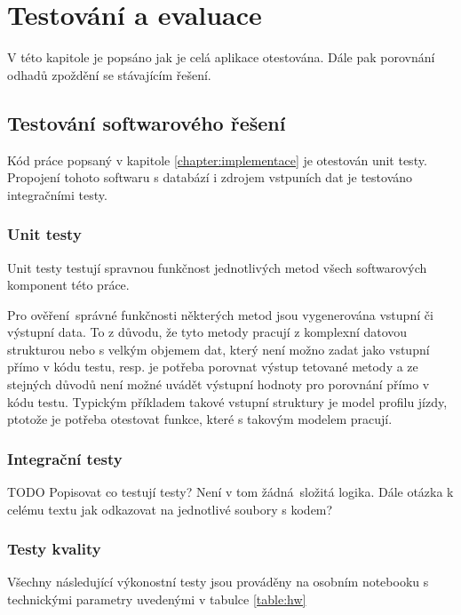 
\chapter{Testování a evaluace}

V této kapitole je popsáno jak je celá aplikace otestována. Dále pak porovnání odhadů zpoždění se stávajícím řešení.

\section{Testování softwarového řešení}

Kód práce popsaný v kapitole \ref{chapter:implementace} je otestován unit testy. Propojení  tohoto softwaru s databází i zdrojem vstpuních dat je testováno integračními testy.

\subsection{Unit testy}

Unit testy testují spravnou funkčnost jednotlivých metod všech softwarových komponent této práce.

Pro ověření správné funkčnosti některých metod jsou vygenerována vstupní či výstupní data. To z důvodu, že tyto metody pracují z komplexní datovou strukturou nebo s velkým objemem dat, který není možno zadat jako vstupní přímo v kódu testu, resp. je potřeba porovnat výstup tetované metody a ze stejných důvodů není možné uvádět výstupní hodnoty pro porovnání přímo v kódu testu. Typickým příkladem takové vstupní struktury je model profilu jízdy, ptotože je potřeba otestovat funkce, které s takovým modelem pracují.

\subsection{Integrační testy}

TODO Popisovat co testují testy? Není v tom žádná složitá logika. Dále otázka k celému textu jak odkazovat na jednotlivé soubory s kodem?

\subsection{Testy kvality}

Všechny následující výkonostní testy jsou prováděny na osobním notebooku s technickými parametry uvedenými v tabulce \ref{table:hw}

